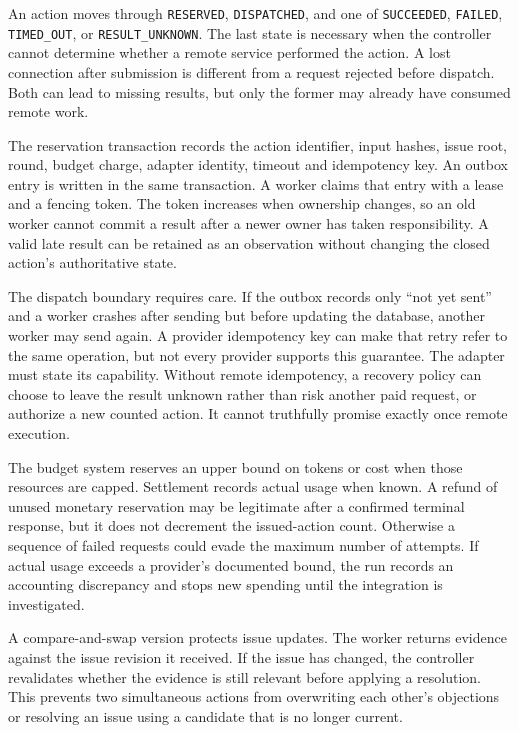 An action moves through \texttt{RESERVED}, \texttt{DISPATCHED}, and one of
\texttt{SUCCEEDED}, \texttt{FAILED}, \texttt{TIMED\_OUT}, or
\texttt{RESULT\_UNKNOWN}. The last state is necessary when the controller cannot
determine whether a remote service performed the action. A lost connection after
submission is different from a request rejected before dispatch. Both can lead
to missing results, but only the former may already have consumed remote work.

The reservation transaction records the action identifier, input hashes, issue
root, round, budget charge, adapter identity, timeout and idempotency key. An
outbox entry is written in the same transaction. A worker claims that entry with
a lease and a fencing token. The token increases when ownership changes, so an
old worker cannot commit a result after a newer owner has taken responsibility.
A valid late result can be retained as an observation without changing the closed
action's authoritative state.

The dispatch boundary requires care. If the outbox records only ``not yet sent''
and a worker crashes after sending but before updating the database, another
worker may send again. A provider idempotency key can make that retry refer to the
same operation, but not every provider supports this guarantee. The adapter must
state its capability. Without remote idempotency, a recovery policy can choose to
leave the result unknown rather than risk another paid request, or authorize a
new counted action. It cannot truthfully promise exactly once remote execution.

The budget system reserves an upper bound on tokens or cost when those resources
are capped. Settlement records actual usage when known. A refund of unused
monetary reservation may be legitimate after a confirmed terminal response, but
it does not decrement the issued-action count. Otherwise a sequence of failed
requests could evade the maximum number of attempts. If actual usage exceeds a
provider's documented bound, the run records an accounting discrepancy and stops
new spending until the integration is investigated.

A compare-and-swap version protects issue updates. The worker returns evidence
against the issue revision it received. If the issue has changed, the controller
revalidates whether the evidence is still relevant before applying a resolution.
This prevents two simultaneous actions from overwriting each other's objections
or resolving an issue using a candidate that is no longer current.

